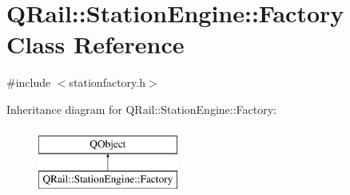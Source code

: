 \hypertarget{classQRail_1_1StationEngine_1_1Factory}{}\section{Q\+Rail\+::Station\+Engine\+::Factory Class Reference}
\label{classQRail_1_1StationEngine_1_1Factory}


{\ttfamily \#include $<$stationfactory.\+h$>$}

Inheritance diagram for Q\+Rail\+::Station\+Engine\+::Factory\+:\begin{figure}[H]
\begin{center}
\leavevmode
\includegraphics[height=2.000000cm]{classQRail_1_1StationEngine_1_1Factory}
\end{center}
\end{figure}
